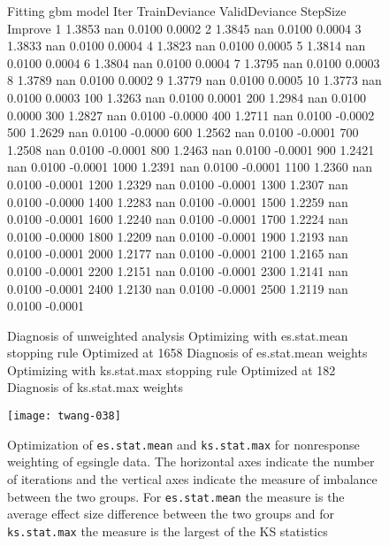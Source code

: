 \documentclass{article}
\begin{document}
\begin{figure}
\begin{center}
\begin{Schunk}
\begin{Soutput}
Fitting gbm model
Iter   TrainDeviance   ValidDeviance   StepSize   Improve
     1        1.3853             nan     0.0100    0.0002
     2        1.3845             nan     0.0100    0.0004
     3        1.3833             nan     0.0100    0.0004
     4        1.3823             nan     0.0100    0.0005
     5        1.3814             nan     0.0100    0.0004
     6        1.3804             nan     0.0100    0.0004
     7        1.3795             nan     0.0100    0.0003
     8        1.3789             nan     0.0100    0.0002
     9        1.3779             nan     0.0100    0.0005
    10        1.3773             nan     0.0100    0.0003
   100        1.3263             nan     0.0100    0.0001
   200        1.2984             nan     0.0100    0.0000
   300        1.2827             nan     0.0100   -0.0000
   400        1.2711             nan     0.0100   -0.0002
   500        1.2629             nan     0.0100   -0.0000
   600        1.2562             nan     0.0100   -0.0001
   700        1.2508             nan     0.0100   -0.0001
   800        1.2463             nan     0.0100   -0.0001
   900        1.2421             nan     0.0100   -0.0001
  1000        1.2391             nan     0.0100   -0.0001
  1100        1.2360             nan     0.0100   -0.0001
  1200        1.2329             nan     0.0100   -0.0001
  1300        1.2307             nan     0.0100   -0.0000
  1400        1.2283             nan     0.0100   -0.0001
  1500        1.2259             nan     0.0100   -0.0001
  1600        1.2240             nan     0.0100   -0.0001
  1700        1.2224             nan     0.0100   -0.0000
  1800        1.2209             nan     0.0100   -0.0001
  1900        1.2193             nan     0.0100   -0.0001
  2000        1.2177             nan     0.0100   -0.0001
  2100        1.2165             nan     0.0100   -0.0001
  2200        1.2151             nan     0.0100   -0.0001
  2300        1.2141             nan     0.0100   -0.0001
  2400        1.2130             nan     0.0100   -0.0001
  2500        1.2119             nan     0.0100   -0.0001

Diagnosis of unweighted analysis
Optimizing with es.stat.mean stopping rule
   Optimized at 1658 
Diagnosis of es.stat.mean weights
Optimizing with ks.stat.max stopping rule
   Optimized at 182 
Diagnosis of ks.stat.max weights
\end{Soutput}
\end{Schunk}
\texttt{[image: twang-038]}
\end{center}
\caption{Optimization of \texttt{es.stat.mean} and
\texttt{ks.stat.max} for nonresponse weighting of egsingle data. The
         horizontal axes indicate the number of iterations and the vertical
         axes indicate the measure of imbalance between the two groups. For
         \texttt{es.stat.mean} the measure is the average effect size
         difference between the two groups and for \texttt{ks.stat.max} the
         measure is the largest of the KS statistics}
\label{fig:psoptimize2}
\end{figure}
\end{document}
